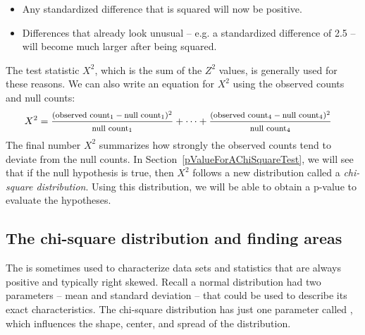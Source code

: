 \begin{itemize}
\setlength{\itemsep}{0mm}
\item Any standardized difference that is squared will now be positive.
\item Differences that already look unusual -- e.g. a standardized difference of 2.5 -- will become much larger after being squared.
\end{itemize}
The test statistic $X^2$, which is the sum of the $Z^2$ values, is generally used for these reasons. We can also write an equation for $X^2$ using the observed counts and null counts:
\begin{align*}
X^2 &=
	\frac
	{\text{\footnotesize$(\text{observed count}_1 - \text{null count}_1)^2$}}
	{\text{\footnotesize$\text{null count}_1$}}
	+ \dots + \frac
	{\text{\footnotesize$(\text{observed count}_4 - \text{null count}_4)^2$}}
	{\text{\footnotesize$\text{null count}_4$}}
\end{align*}
The final number $X^2$ summarizes how strongly the observed counts tend to deviate from the null counts. In Section~\ref{pValueForAChiSquareTest}, we will see that if the null hypothesis is true, then $X^2$ follows a new distribution called a \emph{chi-square distribution}. Using this distribution, we will be able to obtain a p-value to evaluate the hypotheses.


\subsection{The chi-square distribution and finding areas}

The  is sometimes used to
characterize data sets and statistics that are always positive
and typically right skewed. Recall a normal distribution had
two parameters -- mean and standard deviation -- that could be
used to describe its exact characteristics.
The chi-square distribution has just one parameter called
,
which influences the shape, center, and spread of the distribution.


